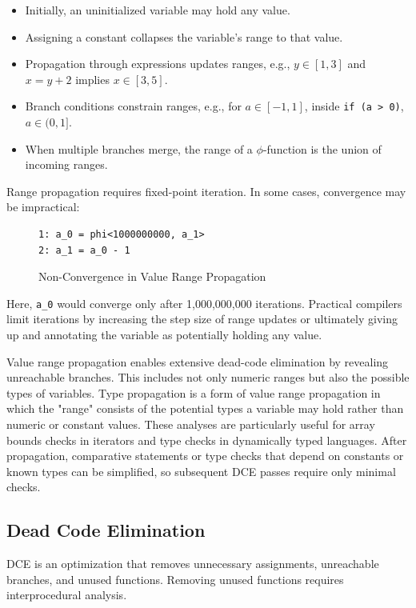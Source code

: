 \begin{itemize}
\item Initially, an uninitialized variable may hold any value.  
\item Assigning a constant collapses the variable’s range to that value.  
\item Propagation through expressions updates ranges, e.g., $y \in [1,3]$ and $x = y + 2$ implies $x \in [3,5]$.  
\item Branch conditions constrain ranges, e.g., for $a \in [-1,1]$, inside \texttt{if (a > 0)}, $a \in (0,1]$.  
\item When multiple branches merge, the range of a $\phi$-function is the union of incoming ranges.  
\end{itemize}

Range propagation requires fixed-point iteration. In some cases, convergence may be impractical:

\begin{figure}[h]
\begin{lstlisting}
1: a_0 = phi<1000000000, a_1>
2: a_1 = a_0 - 1
\end{lstlisting}
\caption{Non-Convergence in Value Range Propagation}
\end{figure}

Here, \texttt{a\_0} would converge only after 1,000,000,000 iterations. Practical compilers limit iterations by increasing the step size of range updates or ultimately giving up and annotating the variable as potentially holding any value\cite{dragon-book}.

Value range propagation enables extensive dead-code elimination by revealing unreachable branches. This includes not only numeric ranges but also the possible types of variables. Type propagation is a form of value range propagation in which the "range" consists of the potential types a variable may hold rather than numeric or constant values. These analyses are particularly useful for array bounds checks in iterators and type checks in dynamically typed languages. After propagation, comparative statements or type checks that depend on constants or known types can be simplified, so subsequent \acf{DCE} passes require only minimal checks.

\subsection{Dead Code Elimination}

\acf{DCE} is an optimization that removes unnecessary assignments, unreachable branches, and unused functions. Removing unused functions requires interprocedural analysis.

